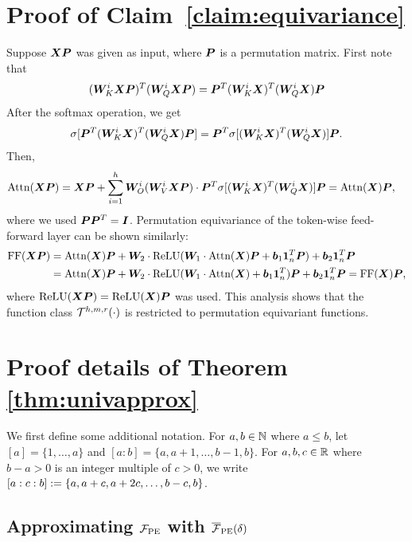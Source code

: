 \section{Proof of Claim~\ref{claim:equivariance}}
\label{sec:proof_equivariance}
Suppose ${\bm{X}} {\bm{P}}$ was given as input, where ${\bm{P}}$ is a permutation matrix.
First note that 
\begin{equation*}
({\bm{W}}_K^i {\bm{X}} {\bm{P}})^T ({\bm{W}}_Q^i {\bm{X}} {\bm{P}}) = {\bm{P}}^T ({\bm{W}}_K^i {\bm{X}})^T ({\bm{W}}_Q^i {\bm{X}}) {\bm{P}}    
\end{equation*}
After the softmax operation, we get 
\begin{equation*}
\sigma[{\bm{P}}^T ({\bm{W}}_K^i {\bm{X}})^T ({\bm{W}}_Q^i {\bm{X}}) {\bm{P}}] = {\bm{P}}^T \sigma[ ({\bm{W}}_K^i {\bm{X}})^T ({\bm{W}}_Q^i {\bm{X}}) ] {\bm{P}}.
\end{equation*}
Then,
\begin{align*}
    {\rm Attn}({\bm{X}} {\bm{P}}) &= {\bm{X}} {\bm{P}} + \sum_{i=1}^h {\bm{W}}_O^i ({\bm{W}}_V^i {\bm{X}} {\bm{P}}) \cdot {\bm{P}}^T \sigma [ ({\bm{W}}_K^i {\bm{X}})^T ({\bm{W}}_Q^i {\bm{X}}) ] {\bm{P}} = {\rm Attn}({\bm{X}}) {\bm{P}},
\end{align*}
where we used ${\bm{P}} {\bm{P}}^T = {\bm{I}}$. Permutation equivariance of the token-wise feed-forward layer can be shown similarly:
\begin{align*}
    {\rm FF}({\bm{X}} {\bm{P}}) &= {\rm Attn}({\bm{X}}){\bm{P}} + {\bm{W}}_2 \cdot {\rm ReLU} ({\bm{W}}_1 \cdot {\rm Attn}({\bm{X}}){\bm{P}} + {\bm{b}}_1 {\bm{1}}_n^T {\bm{P}}) + {\bm{b}}_2 {\bm{1}}_n^T {\bm{P}}\\
    &= {\rm Attn}({\bm{X}}){\bm{P}} + {\bm{W}}_2 \cdot {\rm ReLU} ({\bm{W}}_1 \cdot {\rm Attn}({\bm{X}}) + {\bm{b}}_1 {\bm{1}}_n^T) {\bm{P}} + {\bm{b}}_2 {\bm{1}}_n^T {\bm{P}} = {\rm FF}({\bm{X}}){\bm{P}},
\end{align*}
where ${\rm ReLU}({\bm{X}} {\bm{P}}) = {\rm ReLU}({\bm{X}}) {\bm{P}}$ was used.
This analysis shows that the function class $\mathcal{T}^{h,m,r}(\cdot)$ is restricted to permutation equivariant functions.


\section{Proof details of Theorem \ref{thm:univapprox}}\label{sec:proof_main}
We first define some additional notation.
For $a, b \in \mathbb{N}$ where $a \leq b$, let $[a] = \{1, \dots, a\}$ and $[a:b] = \{a, a+1, \dots, b-1, b\}$.
For $a, b, c \in \mathbb{R}$ where $b-a > 0$ is an integer multiple of $c > 0$, we write $[a:c:b] := \{a, a+c, a+2c, \dots, b-c, b\}$.

\subsection{Approximating $\mathcal{F}_{\rm PE}$ with $\overline{\mathcal{F}}_{\rm PE}(\delta)$}
\label{appen:thm2-part1}

